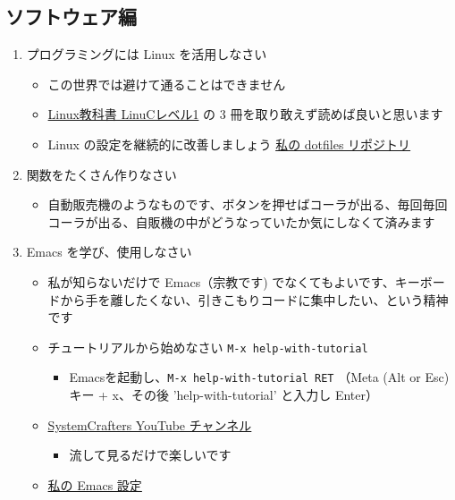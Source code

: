 \documentclass[a4paper,11pt,uplatex]{jsarticle}
\begin{document}
\subsection{ソフトウェア編}
\begin{enumerate}
    \item プログラミングには Linux を活用しなさい
    \begin{itemize}
        \item この世界では避けて通ることはできません
        \item \href{https://www.amazon.co.jp/s?k=linux+\%E3\%83\%AC\%E3\%83\%99\%E3\%83\%AB1&crid=RJR3JEEZ0J2T&sprefix=linux+\%2Caps\%2C287&ref=nb_sb_ss_ts-doa-p_7_6}{Linux教科書 LinuCレベル1} の 3 冊を取り敢えず読めば良いと思います
        \item Linux の設定を継続的に改善しましょう \href{https://github.com/ywatanabe1989/.dotfiles-public}{私の dotfiles リポジトリ}
    \end{itemize}
    \item 関数をたくさん作りなさい
    \begin{itemize}
        \item 自動販売機のようなものです、ボタンを押せばコーラが出る、毎回毎回コーラが出る、自販機の中がどうなっていたか気にしなくて済みます
    \end{itemize}
    \item Emacs を学び、使用しなさい
    \begin{itemize}
        \item 私が知らないだけで Emacs（宗教です) でなくてもよいです、キーボードから手を離したくない、引きこもりコードに集中したい、という精神です
        \item チュートリアルから始めなさい \texttt{M-x help-with-tutorial}
        \begin{itemize}
            \item Emacsを起動し、\texttt{M-x help-with-tutorial RET} （Meta (Alt or Esc) キー + x、その後 'help-with-tutorial' と入力し Enter）
        \end{itemize}
        \item \href{https://www.youtube.com/playlist?list=PLEoMzSkcN8oPH1au7H6B7bBJ4ZO7BXjSZ}{SystemCrafters YouTube チャンネル}
        \begin{itemize}
            \item 流して見るだけで楽しいです
        \end{itemize}
        \item \href{https://github.com/ywatanabe1989/.dotfiles-public/tree/main/.emacs.d/inits}{私の Emacs 設定}

\end{itemize}
\end{enumerate}
\end{document}
